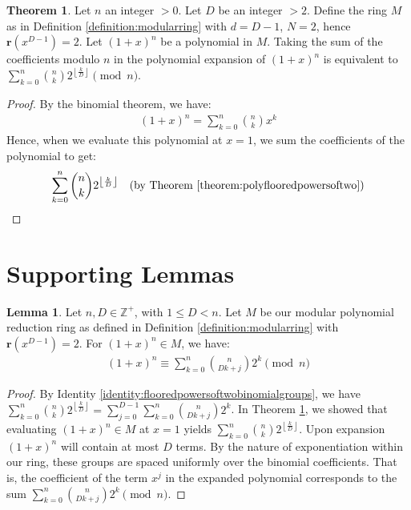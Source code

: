 \documentclass{article}
\theoremstyle{plain}
\theoremstyle{definition}
\newtheorem{theorem}{Theorem}
\newtheorem{lemma}{Lemma}
\newcommand{\floor}[1]{\left\lfloor #1 \right\rfloor}
\newcommand{\redu}{\textbf{r}}
\newcommand{\Z}{\mathbb{Z}}
\begin{document}
\begin{theorem} \label{theorem:polybinomialtransform}
Let $n$ an integer $>0$. Let $D$ be an integer $>2$. Define the ring $M$ as in Definition \ref{definition:modularring} with $d=D-1$, $N=2$, hence $\redu(x^{D-1}) = 2$. Let $(1 + x)^n$ be a polynomial in $M$. Taking the sum of the coefficients modulo $n$ in the polynomial expansion of $ (1 + x)^n $ is equivalent to $\sum_{k=0}^{n} \binom{n}{k} 2^{\floor{\frac{k}{D}}} \pmod{n}$.
\end{theorem}
\begin{proof}
By the binomial theorem, we have:
\begin{align}
    (1 + x)^n = \sum_{k=0}^{n} \binom{n}{k} x^{k}
\end{align}
Hence, when we evaluate this polynomial at \( x = 1 \), we sum the coefficients of the polynomial to get:
\begin{align}
    \sum_{k=0}^{n} \binom{n}{k} 2^{\floor{\frac{k}{D}}} \quad \text{(by Theorem \ref{theorem:polyflooredpowersoftwo})}
\end{align}
\end{proof}

\section{Supporting Lemmas}

\begin{lemma} \label{lemma:polytermcoeffs}
Let $n, D \in \Z^+$, with $1 \leq D < n$. Let $M$ be our modular polynomial reduction ring as defined in Definition \ref{definition:modularring} with $\redu(x^{D-1}) = 2$. For $(1 + x)^n \in M$, we have:
\begin{align}
    [x^j](1 + x)^n \equiv \sum_{k=0}^{n} \binom{n}{D k + j} 2^{k} \pmod{n}
\end{align}
\end{lemma}
\begin{proof}
By Identity \ref{identity:flooredpowersoftwobinomialgroups}, we have $\sum_{k=0}^{n} \binom{n}{k} 2^{\floor{\frac{k}{D}}} = \sum_{j=0}^{D-1} \sum_{k=0}^{n} \binom{n}{D k + j} 2^{k}$. In Theorem \ref{theorem:polybinomialtransform}, we showed that evaluating $(1+x)^n \in M$ at $x=1$ yields $\sum_{k=0}^{n} \binom{n}{k} 2^{\floor{\frac{k}{D}}}$. Upon expansion $(1+x)^n$ will contain at most $D$ terms. By the nature of exponentiation within our ring, these groups are spaced uniformly over the binomial coefficients. That is, the coefficient of the term $x^j$ in the expanded polynomial corresponds to the sum $\sum_{k=0}^{n} \binom{n}{D k + j} 2^{k} \pmod{n}$.
\end{proof}
\end{document}
